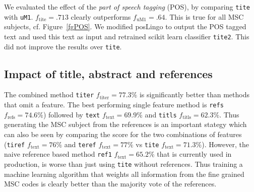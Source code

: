 We evaluated the effect of the \emph{part of speech tagging} (POS), by comparing \texttt{tite} with \texttt{uM1}. $f_\mathrm{tite}=.713$ clearly outperforms $f_\mathrm{uM1}=.64.$ This is true for all MSC subjects, cf. Figure~\ref{fgPOS}. We modified posLingo to output the POS tagged text and used this text as input and retrained scikit learn classifier \texttt{tite2}. This did not improve the results over \texttt{tite}.

\subsection{Impact of title, abstract and references}
The combined method \texttt{titer} $f_\mathrm{titer}=77.3\%$ is significantly better than methods that omit a feature.
The best performing single feature method is \texttt{refs} $f_\mathrm{refs}=74.6\%$) followed by \texttt{text} $f_\mathrm{text}=69.9\%$ and \texttt{titls} $f_\mathrm{titls}=62.3\%$.
Thus generating the MSC subject from the references is an important stategy which can also be seen by comparing the score for the two combinations of features (\texttt{tiref} $f_\mathrm{text}=76\%$ and \texttt{teref} $f_\mathrm{text}=77\%$ vs \texttt{tite} $f_\mathrm{text}=71.3\%$).
However, the naive reference based method \texttt{ref1} $f_\mathrm{text}=65.2\%$ that is currently used in production, is worse than just using \texttt{tite} without references.
Thus training a machine learning algorithm that weights all information from the fine grained MSC codes is clearly better than the majority vote of the references.


